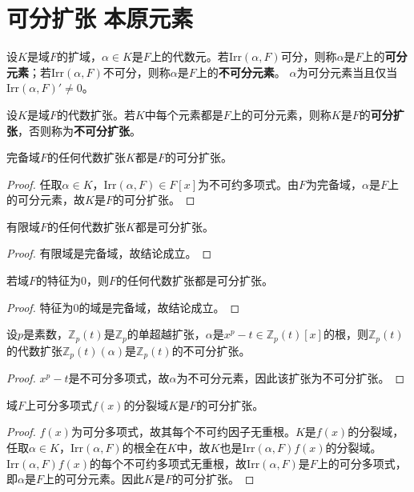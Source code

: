 \documentclass[../../main.tex]{subfiles}%
\begin{document}
\section{可分扩张$\,\,$本原元素}

\begin{definition}
设$K$是域$F$的扩域，$\alpha\in K$是$F$上的代数元。若$\mathrm{Irr}(\alpha,F)$可分，则称$\alpha$是$F$上的\textbf{可分元素}；若$\mathrm{Irr}(\alpha,F)$不可分，则称$\alpha$是$F$上的\textbf{不可分元素}。
$\alpha$为可分元素当且仅当$\mathrm{Irr}(\alpha,F)'\neq0$。
\end{definition}

\begin{definition}
设$K$是域$F$的代数扩张。若$K$中每个元素都是$F$上的可分元素，则称$K$是$F$的\textbf{可分扩张}，否则称为\textbf{不可分扩张}。
\end{definition}

\begin{example}
完备域$F$的任何代数扩张$K$都是$F$的可分扩张。
\end{example}
\begin{proof}
任取$\alpha\in K$，$\mathrm{Irr}(\alpha,F)\in F[x]$为不可约多项式。由$F$为完备域，$\alpha$是$F$上的可分元素，故$K$是$F$的可分扩张。
\end{proof}

\begin{example}
有限域$F$的任何代数扩张$K$都是可分扩张。
\end{example}
\begin{proof}
有限域是完备域，故结论成立。
\end{proof}

\begin{example}
若域$F$的特征为$0$，则$F$的任何代数扩张都是可分扩张。
\end{example}
\begin{proof}
特征为$0$的域是完备域，故结论成立。
\end{proof}

\begin{example}
设$p$是素数，$\mathbb{Z}_p(t)$是$\mathbb{Z}_p$的单超越扩张，$\alpha$是$x^p-t\in\mathbb{Z}_p(t)[x]$的根，则$\mathbb{Z}_p(t)$的代数扩张$\mathbb{Z}_p(t)(\alpha)$是$\mathbb{Z}_p(t)$的不可分扩张。
\end{example}
\begin{proof}
$x^p-t$是不可分多项式，故$\alpha$为不可分元素，因此该扩张为不可分扩张。
\end{proof}

\begin{theorem}
域$F$上可分多项式$f(x)$的分裂域$K$是$F$的可分扩张。
\end{theorem}
\begin{proof}
$f(x)$为可分多项式，故其每个不可约因子无重根。$K$是$f(x)$的分裂域，任取$\alpha\in K$，$\mathrm{Irr}(\alpha,F)$的根全在$K$中，故$K$也是$\mathrm{Irr}(\alpha,F)f(x)$的分裂域。$\mathrm{Irr}(\alpha,F)f(x)$的每个不可约多项式无重根，故$\mathrm{Irr}(\alpha,F)$是$F$上的可分多项式，即$\alpha$是$F$上的可分元素。因此$K$是$F$的可分扩张。
\end{proof}
\end{document}

